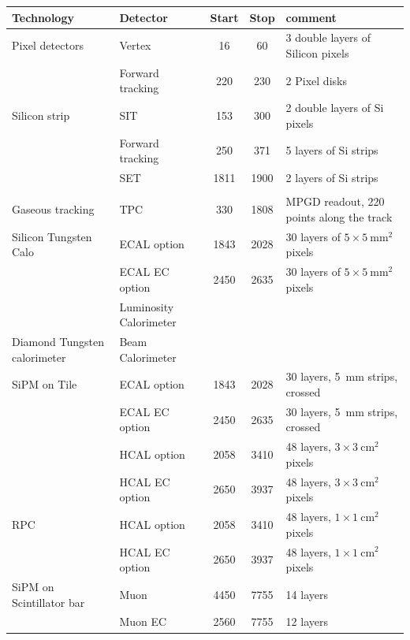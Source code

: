\documentclass[%
 amsmath,amssymb,
 aps,
]{revtex4-1}
\renewcommand{\toprule}{\hline}
\newcommand{\midrule}{\hline}
\begin{document}
\begin{table}[th]
    \centering
    \begin{tabular}{|l|l|c|c|p{4cm}|}
    \toprule
        {\bf Technology} & {\bf Detector} & {\bf Start}   & {\bf Stop} & {\bf comment} \\
        \midrule
Pixel detectors & Vertex & 16   & 60   & 3 double layers of Silicon pixels \\
& Forward tracking  & 220 & 230 & 2 Pixel disks \\
\midrule
Silicon strip   & SIT    & 153  & 300  & 2 double layers of Si pixels            \\
& Forward tracking  & 250 & 371 & 5 layers of Si strips\\
                & SET    & 1811 & 1900 & 2 layers of Si strips           \\
                & & & & \\
Gaseous tracking & TPC & 330 & 1808 & MPGD readout, 220 points along the track\\
\midrule
Silicon Tungsten Calo & ECAL option& 1843 & 2028 & 30 layers of $5\times 5~\mathrm{mm}^2$ pixels \\
& ECAL EC option & 2450 & 2635 & 30 layers of $5\times 5~\mathrm{mm}^2$ pixels \\
& Luminosity Calorimeter & & & \\
\midrule
Diamond Tungsten calorimeter & Beam Calorimeter & &&\\
\midrule
SiPM on Tile & ECAL option   & 1843 & 2028 & 30 layers, 5~mm strips, crossed\\
& ECAL EC option& 2450 & 2635 & 30 layers, 5~mm strips, crossed\\
             & HCAL option   & 2058 & 3410 & 48 layers, $3\times 3~\mathrm{cm}^2$ pixels\\
             & HCAL EC option& 2650 & 3937 & 48 layers, $3\times 3~\mathrm{cm}^2$ pixels\\
\midrule
RPC          & HCAL option   & 2058 & 3410 & 48 layers, $1 \times 1 ~\mathrm{cm}^2$ pixels \\
& HCAL EC option & 2650 & 3937 & 48 layers, $1 \times 1~\mathrm{cm}^2$ pixels\\
\midrule
SiPM on Scintillator bar & Muon & 4450 & 7755 & 14 layers \\
& Muon EC & 2560 & 7755 & 12 layers \\


\end{tabular}
\end{table}
\end{document}
